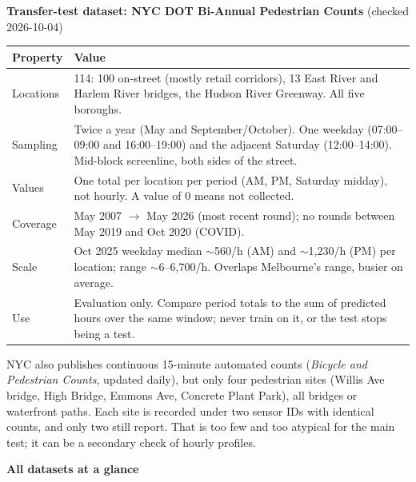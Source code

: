 \documentclass[11pt]{article}
\newcommand{\hrow}{\rowcolor{headgray}}
\begin{document}
\textbf{Transfer-test dataset: NYC DOT Bi-Annual Pedestrian Counts} (checked 2026-10-04)

\begin{xltabular}{\linewidth}{|L{3.6cm}|Y|}
\hline\hrow
\textbf{Property} & \textbf{Value} \\\hline
\endhead
Locations & 114: 100 on-street (mostly retail corridors), 13 East River and Harlem River bridges, the Hudson River Greenway. All five boroughs. \\\hline
Sampling & Twice a year (May and September/October). One weekday (07:00--09:00 and 16:00--19:00) and the adjacent Saturday (12:00--14:00). Mid-block screenline, both sides of the street. \\\hline
Values & One total per location per period (AM, PM, Saturday midday), not hourly. A value of 0 means not collected. \\\hline
Coverage & May 2007 $\rightarrow$ May 2026 (most recent round); no rounds between May 2019 and Oct 2020 (COVID). \\\hline
Scale & Oct 2025 weekday median $\sim$560/h (AM) and $\sim$1,230/h (PM) per location; range $\sim$6--6,700/h. Overlaps Melbourne's range, busier on average. \\\hline
Use & Evaluation only. Compare period totals to the sum of predicted hours over the same window; never train on it, or the test stops being a test. \\\hline
\end{xltabular}

NYC also publishes continuous 15-minute automated counts (\emph{Bicycle and Pedestrian Counts}, updated daily), but only four pedestrian sites (Willis Ave bridge, High Bridge, Emmons Ave, Concrete Plant Park), all bridges or waterfront paths. Each site is recorded under two sensor IDs with identical counts, and only two still report. That is too few and too atypical for the main test; it can be a secondary check of hourly profiles.

\textbf{All datasets at a glance}
\end{document}
